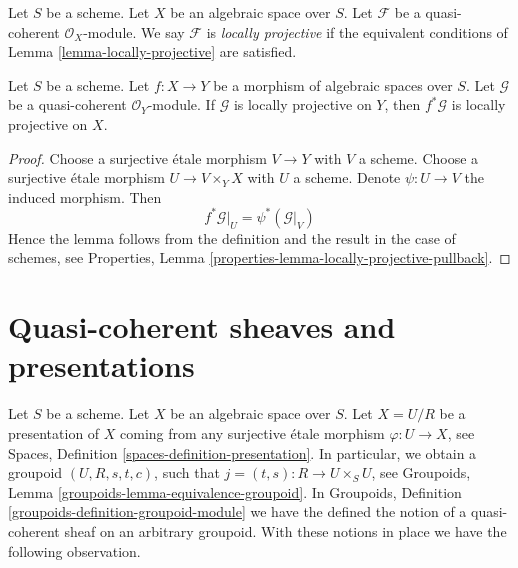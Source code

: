 \begin{definition}
\label{definition-locally-projective}
Let $S$ be a scheme. Let $X$ be an algebraic space over $S$.
Let $\mathcal{F}$ be a quasi-coherent $\mathcal{O}_X$-module.
We say $\mathcal{F}$ is {\it locally projective}
if the equivalent conditions of
Lemma \ref{lemma-locally-projective}
are satisfied.
\end{definition}

\begin{lemma}
\label{lemma-locally-projective-pullback}
Let $S$ be a scheme.
Let $f : X \to Y$ be a morphism of algebraic spaces over $S$.
Let $\mathcal{G}$ be a quasi-coherent $\mathcal{O}_Y$-module.
If $\mathcal{G}$ is locally projective on $Y$, then $f^*\mathcal{G}$
is locally projective on $X$.
\end{lemma}

\begin{proof}
Choose a surjective \'etale morphism $V \to Y$ with $V$ a scheme.
Choose a surjective \'etale morphism $U \to V \times_Y X$ with
$U$ a scheme. Denote $\psi : U \to V$ the induced morphism.
Then
$$
f^*\mathcal{G}|_U = \psi^*(\mathcal{G}|_V)
$$
Hence the lemma follows from the definition and the result in the
case of schemes, see
Properties, Lemma \ref{properties-lemma-locally-projective-pullback}.
\end{proof}





\section{Quasi-coherent sheaves and presentations}
\label{section-quasi-coherent-presentation}

\noindent
Let $S$ be a scheme. Let $X$ be an algebraic space over $S$.
Let $X = U/R$ be a presentation of $X$ coming from any surjective
\'etale morphism $\varphi : U \to X$, see
Spaces, Definition \ref{spaces-definition-presentation}.
In particular, we obtain a groupoid $(U, R, s, t, c)$, such that
$j = (t, s) : R \to U \times_S U$, see
Groupoids, Lemma \ref{groupoids-lemma-equivalence-groupoid}.
In
Groupoids, Definition \ref{groupoids-definition-groupoid-module}
we have the defined the notion of a quasi-coherent sheaf
on an arbitrary groupoid. With these notions in place we have
the following observation.

